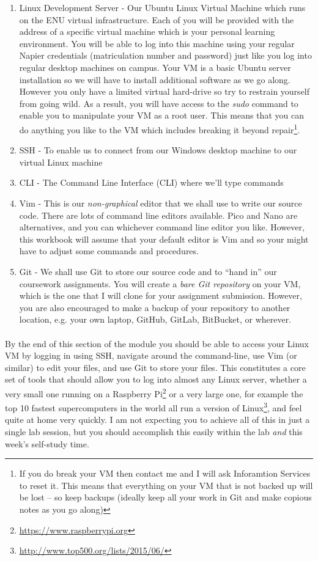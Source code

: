 \documentclass[12pt, a4paper, oneside]{book}
\begin{document}
\begin{enumerate}
\item Linux Development Server - Our Ubuntu Linux Virtual Machine which runs on the ENU virtual infrastructure. Each of you will be provided with the address of a specific virtual machine which is your personal learning environment. You will be able to log into this machine using your regular Napier credentials (matriculation number and password) just like you log into regular desktop machines on campus. Your VM is a basic Ubuntu server installation so we will have to install additional software as we go along. However you only have a limited virtual hard-drive so try to restrain yourself from going wild. As a result, you will have access to the \emph{sudo} command to enable you to manipulate your VM as a root user. This means that you can do anything you like to the VM which includes breaking it beyond repair\footnote{If you do break your VM then contact me and I will ask Inforamtion Services to reset it. This means that everything on your VM that is not backed up will be lost -- so keep backups (ideally keep all your work in Git and make copious notes as you go along)}.
\item SSH - To enable us to connect from our Windows desktop machine to our virtual Linux machine
\item CLI - The Command Line Interface (CLI) where we'll type commands
\item Vim - This is our \emph{non-graphical} editor that we shall use to write our source code. There are lots of command line editors available. Pico and Nano are alternatives, and you can whichever command line editor you like. However, this workbook will assume that your default editor is Vim and so your might have to adjust some commands and procedures.
\item Git - We shall use Git to store our source code and to ``hand in'' our coursework assignments. You will create a \emph{bare Git repository} on your VM, which is the one that I will clone for your assignment submission. However, you are also encouraged to make a backup of your repository to another location, e.g. your own laptop, GitHub, GitLab, BitBucket, or wherever.
\end{enumerate}

\paragraph{} By the end of this section of the module you should be able to access your Linux VM by logging in using SSH, navigate around the command-line, use Vim (or similar) to edit your files, and use Git to store your files. This constitutes a core set of tools that should allow you to log into almost any Linux server, whether a very small one running on a Raspberry Pi\footnote{\url{https://www.raspberrypi.org}} or a very large one, for example the top 10 fastest supercomputers in the world all run a version of Linux\footnote{\url{http://www.top500.org/lists/2015/06/}}, and feel quite at home very quickly. I am not expecting you to achieve all of this in just a single lab session, but you should accomplish this easily within the lab \emph{and} this week's self-study time.
\end{document}
